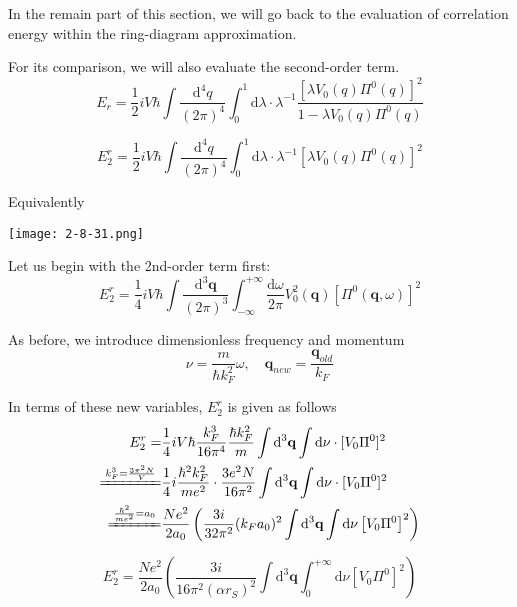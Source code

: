 In the remain part of this section, we will go back to the evaluation of correlation energy within the ring-diagram approximation.

For its comparison, we will also evaluate the second-order term.
\begin{equation*} \tag{2.8.9}
E_r = \frac{1}{2}i V\hbar \int \frac{\mathrm{d}^4 q}{(2\pi)^4} \int_0^1 \mathrm{d} \lambda \cdot \lambda^{-1} \frac{[\lambda V_0(q) \Pi^0(q)]^2}{1-\lambda V_0(q) \Pi^0(q)}
\end{equation*}

\begin{equation*} \label{Eqs2.8.9.a} \tag{2.8.9.a}
E_2^r = \frac{1}{2}i V \hbar\int \frac{\mathrm{d}^4 q}{(2\pi)^4} \int_0^1 \mathrm{d} \lambda \cdot \lambda^{-1}  \left[ \lambda V_0(q)\Pi^0(q) \right]^2
\end{equation*}

Equivalently
\begin{center} \label{Fig2.8.31}
\texttt{[image: 2-8-31.png]}
\end{center}

Let us begin with the 2nd-order term first:
\[E_2^r = \frac{1}{4}i V \hbar\int \frac{\mathrm{d}^3 \mathbf{q}}{(2\pi)^3} \int_{-\infty}^{+\infty} \frac{\mathrm{d} \omega}{2\pi} V_0^2(\mathbf{q})  \left[ \Pi^0(\mathbf{q},\omega) \right]^2\]

As before, we introduce dimensionless frequency and momentum
\begin{equation*} \tag{2.8.18}
\nu = \frac{m}{\hbar k_F^2} \omega, \quad \mathbf{q}_{new} = \frac{\mathbf{q}_{old}}{k_F}
\end{equation*}

In terms of these new variables, $E_2^r$ is given as follows
\[\begin{split}E_2^r =& \frac{1}{4}i V \hbar \frac{k_F^3}{16\pi^4} \frac{\hbar k_F^2}{m}
\int \mathrm{d}^3 \mathbf{q} \int \mathrm{d} \nu \cdot [V_0 \Pi^0]^2\\
\xlongequal{k_F^3 = \frac{3\pi^2 N}{V}}& \frac{1}{4}i\frac{\hbar^2 k_F^2}{m e^2}\cdot \frac{3 e^2 N}{16 \pi^2}
\int \mathrm{d}^3 \mathbf{q} \int \mathrm{d} \nu \cdot [V_0 \Pi^0]^2\\
\xlongequal{\frac{\hbar^2}{m e^2}=a_0}& \frac{N e^2}{2 a_0} \left( \frac{3i}{32\pi^2}(k_F a_0)^2 \int \mathrm{d}^3 \mathbf{q} \int \mathrm{d} \nu \left[ V_0 \Pi^0 \right]^2 \right)
\end{split}\]

\begin{equation*} \label{Eqs2.8.9.b} \tag{2.8.9.b}
E_2^r = \frac{N e^2}{2 a_0} \left( \frac{3i}{16\pi^2 (\alpha r_S)^2} \int \mathrm{d}^3 \mathbf{q} \int_0^{+\infty} \mathrm{d} \nu \left[ V_0 \Pi^0 \right]^2 \right)
\end{equation*}

